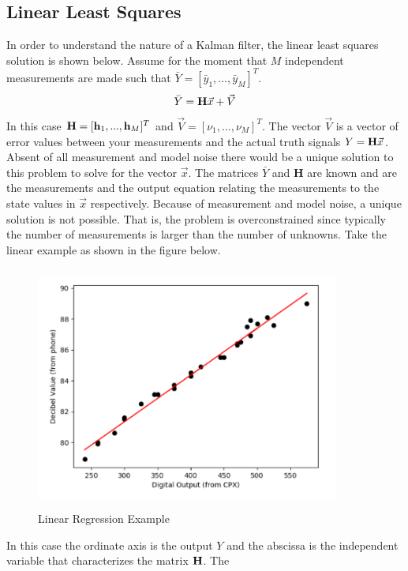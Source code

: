 \documentclass{article}
\begin{document}
\subsection{Linear Least Squares}

In order to understand the nature of a Kalman filter, the linear least
squares solution is shown below. Assume for the moment that $M$
independent measurements are made such that $\bar{Y} = [\bar{y}_1,...,\bar{y}_M]^T$.
\begin{equation}
  \bar{Y} = {\bf H}\vec{x} + \vec{V}
\end{equation}
In this case ${\bf H} = [{\bf h}_1,...,{\bf h}_M]^T$ and $\vec{V} = [\nu_1,...,\nu_M]^T$. 
The vector $\vec{V}$ is a vector of error values between your
measurements and the actual truth signals $Y = {\bf H}\vec{x}$. Absent
of all measurement and model noise there 
would be a unique solution to this problem to solve for the vector
$\vec{x}$. The matrices $\bar{Y}$ and {\bf H} are
known and are the measurements and the output equation relating the
measurements to the state values in $\vec{x}$ respectively. Because of
measurement and model noise, a unique solution is not possible. That
is, the problem is overconstrained since typically the number of measurements is larger
than the number of unknowns. Take the linear example as shown in the
figure below.
\begin{figure}[H]
  \begin{center}
  \includegraphics[height=80mm, width=100mm]{Figures/Linear_Regression.png}
  \end{center}
  \caption{Linear Regression Example}\label{f:linear_regression}
\end{figure}
In this case the ordinate axis is the output $Y$ and the abscissa is
the independent variable that characterizes the matrix ${\bf H}$. The
\end{document}
